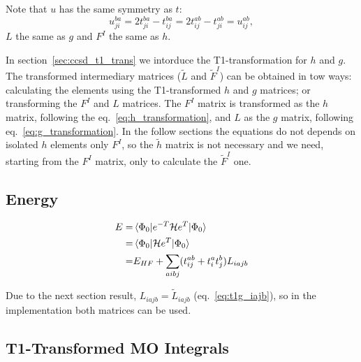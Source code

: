 Note that $u$ has the same symmetry as $t$:
\begin{equation}
  u_{ji}^{ba}=2t_{ji}^{ba}-t_{ij}^{ba}=2t_{ij}^{ab}-t_{ji}^{ab}=u_{ij}^{ab},
\end{equation}
$L$ the same as $g$ and $F^I$ the same as $h$.

In section~\ref{sec:ccsd_t1_trans} we intorduce the T1-transformation for $h$ and $g$.
The transformed intermediary matrices (${\tilde L}$ and ${\tilde F}^I$) can be obtained in tow ways:
calculating the elements using the T1-transformed $h$ and $g$ matrices;
or transforming the $F^I$ and $L$ matrices.
The $F^I$ matrix is transformed as the $h$ matrix, following the eq.~\ref{eq:h_transformation},
and $L$ as the $g$ matrix, following eq.~\ref{eq:g_transformation}.
In the follow sections the equations do not depends on isolated $h$ elements only $F^I$,
so the $\tilde h$ matrix is not necessary and we need, starting from the $F^I$ matrix, only to calculate the $\tilde F^I$ one.

\subsection{Energy}
\hypertarget{sec:ccsd_energy}{}
\label{sec:ccsd_energy}

\begin{equation}
  \begin{split}
    E =& \mel{\Phi_0}{e^{-T}\ensuremath{\mathcal{H}}e^T}{\Phi_0}\\
    =& \mel{\Phi_0}{\ensuremath{\mathcal{H}}e^T}{\Phi_0}\\
    =& E_{HF} + \sum_{aibj}(t_{ij}^{ab} + t_i^at_j^b) L_{iajb}
  \end{split}
\end{equation}

Due to the next section result, $L_{iajb}={\tilde L}_{iajb}$ (eq.~\ref{eq:t1g_iajb}), so in the implementation both matrices can be used. 

\subsection{T1-Transformed MO Integrals}
\hypertarget{sec:ccsd_t1_trans}{}
\label{sec:ccsd_t1_trans}

